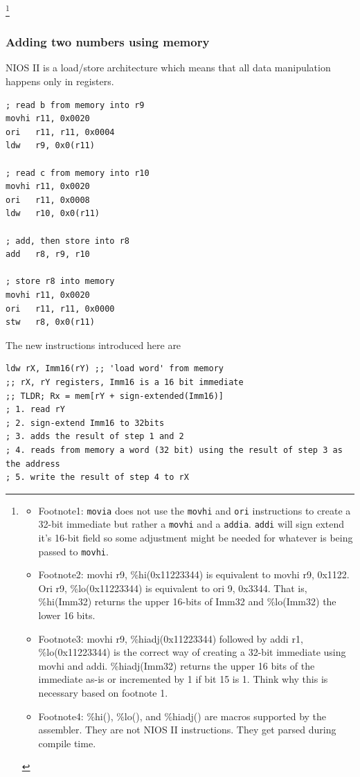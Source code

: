 \documentclass[../notes.tex]{subfiles}
\begin{document}
{\let\thefootnote\relax\footnote{
	\begin{itemize}
		\item Footnote1: \texttt{movia} does not use the \texttt{movhi} and \texttt{ori} instructions to create a 32-bit immediate but rather a \texttt{movhi} and a \texttt{addia}.
\texttt{addi}  will sign extend it's 16-bit field so some adjustment might be needed for whatever is being passed to \texttt{movhi}.
		\item Footnote2: movhi r9, \%hi(0x11223344) is equivalent to movhi r9, 0x1122. Ori r9, \%lo(0x11223344) is equivalent to ori 9, 0x3344. That is, \%hi(Imm32) returns the upper 16-bits of Imm32 and \%lo(Imm32) the lower 16 bits.
		\item Footnote3: movhi r9, \%hiadj(0x11223344) followed by addi r1, \%lo(0x11223344) is the correct way of creating a 32-bit immediate using movhi and addi. \%hiadj(Imm32) returns the upper 16 bits of the immediate  as-is or incremented by 1 if bit 15 is 1. Think why this is necessary based on footnote 1.
		\item Footnote4: \%hi(), \%lo(), and \%hiadj() are macros supported by the assembler. They are not NIOS II instructions. They get parsed during compile time. 
	\end{itemize}
}}


\subsubsection{Adding two numbers using memory}

NIOS II is a load/store architecture which means that all data manipulation happens only in registers.


\begin{listing}[H]
\begin{verbatim}
; read b from memory into r9
movhi r11, 0x0020
ori   r11, r11, 0x0004
ldw   r9, 0x0(r11)

; read c from memory into r10
movhi r11, 0x0020
ori   r11, 0x0008
ldw   r10, 0x0(r11)

; add, then store into r8
add   r8, r9, r10

; store r8 into memory
movhi r11, 0x0020
ori   r11, r11, 0x0000
stw   r8, 0x0(r11)
\end{verbatim}
\end{listing}


The new instructions introduced here are


\begin{listing}[H]
\begin{verbatim}
ldw rX, Imm16(rY) ;; 'load word' from memory
;; rX, rY registers, Imm16 is a 16 bit immediate
;; TLDR; Rx = mem[rY + sign-extended(Imm16)]
; 1. read rY
; 2. sign-extend Imm16 to 32bits
; 3. adds the result of step 1 and 2
; 4. reads from memory a word (32 bit) using the result of step 3 as the address
; 5. write the result of step 4 to rX
\end{verbatim}
\end{listing}
\end{document}
